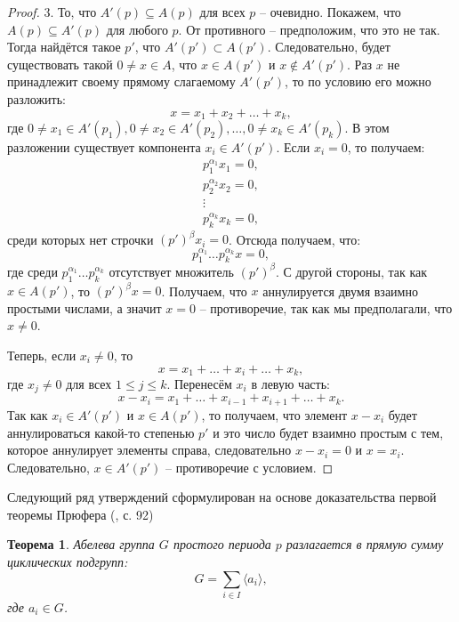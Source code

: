 \documentclass{article}
\newtheorem{theorem}{Теорема}[section]
\begin{document}
\begin{proof}
    3. То, что $A'(p) \subseteq A(p)$ для всех $p$ -- очевидно. Покажем, что $A(p) \subseteq A'(p)$ для любого $p$. От противного -- предположим, что это не так. Тогда найдётся такое $p'$, что $A'(p') \subset A(p')$. Следовательно, будет существовать такой $0 \neq x \in A$, что $x \in A(p')$ и $x \notin A'(p')$. Раз $x$ не принадлежит своему прямому слагаемому $A'(p')$, то по условию его можно разложить: $$ x = x_1 + x_2 + \ldots + x_k, $$ где $0 \neq x_1 \in A'(p_1), 0 \neq x_2 \in A'(p_2), \ldots, 0 \neq x_k \in A'(p_k)$. В этом разложении существует компонента $x_i \in A'(p')$.
    Если $x_i = 0$, то получаем:
    \begin{gather*}
        p_1^{\alpha_1} x_1 = 0, \\
        p_2^{\alpha_2} x_2 = 0, \\
        \vdots \\
        p_k^{\alpha_k} x_k  = 0,
    \end{gather*}
    среди которых нет строчки $(p')^\beta x_i = 0$.
    Отсюда получаем, что: $$ p_1^{\alpha_1} \dots p_k^{\alpha_k} x = 0, $$ где среди $p_1^{\alpha_1} \dots p_k^{\alpha_k}$ отсутствует множитель $(p')^\beta$. С другой стороны, так как $x \in A(p')$, то $(p')^\beta x = 0$. Получаем, что $x$ аннулируется двумя взаимно простыми числами, а значит $x = 0$ -- противоречие, так как мы предполагали, что $x \neq 0$.
    
    Теперь, если $x_i \neq 0$, то $$ x = x_1 + \dots + x_i + \dots + x_k, $$ где $x_j \neq 0$ для всех $1 \leqslant j \leqslant k$. Перенесём $x_i$ в левую часть: $$ x - x_i = x_1 + \dots + x_{i - 1} + x_{i + 1} + \dots +x_k. $$ Так как $x_i \in A'(p')$ и $x \in A(p')$, то получаем, что элемент $x - x_i$ будет аннулироваться какой-то степенью $p'$ и это число будет взаимно простым с тем, которое аннулирует элементы справа, следовательно $x - x_i = 0$ и $x = x_i$. Следовательно, $x \in A'(p')$ -- противоречие с условием.
\end{proof}

Следующий ряд утверждений сформулирован на основе доказательства первой теоремы Прюфера (\cite{kargapolov}, с. 92)

\begin{theorem} \label{rfunqweiop}
    Абелева группа $G$ простого периода $p$ разлагается в прямую сумму циклических подгрупп: $$ G = \sum_{i \in I} \langle a_i \rangle, $$ где $a_i \in G$.
\end{theorem}
\end{document}
